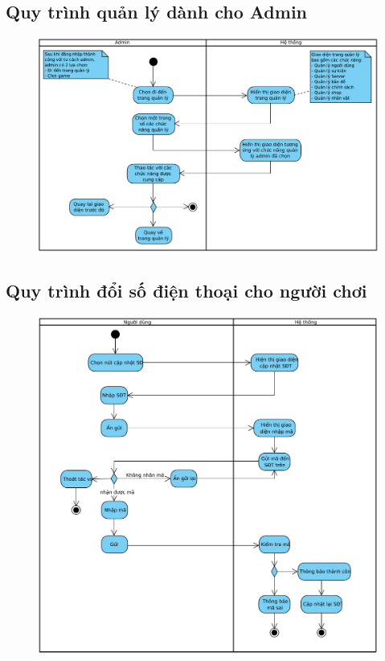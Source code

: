 \documentclass[3p]{elsarticle}
\begin{document}
\subsection{Quy trình quản lý dành cho Admin}
\begin{figure}[!htbp]
	\centering
	\includegraphics[scale=.65]{images/manage.pdf}
\end{figure}
%
\newpage
\subsection{Quy trình đổi số điện thoại cho người chơi}
\begin{figure}[!htbp]
	\centering
	\includegraphics[scale=.75]{images/ChangePhoneNumber.pdf}
\end{figure}
%
\newpage
\end{document}
